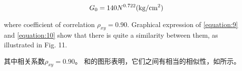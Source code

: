 \begin{align}
    G_0=140N^{0.722}(\rm{kg/cm^2})
    \label{equation:10}
\end{align}

\begin{paracol}{2}
    
    \noindent{}where coefficient of correlation $\rho_{xy}=0.90$. Graphical expression of \autoref{equation:9} and \autoref{equation:10} show that there is quite a similarity between them, as illustrated in Fig. 11.

    \switchcolumn

    \noindent{}其中相关系数$\rho_{xy}=0.90$。 和的图形表明，它们之间有相当的相似性，如所示。
\end{paracol}